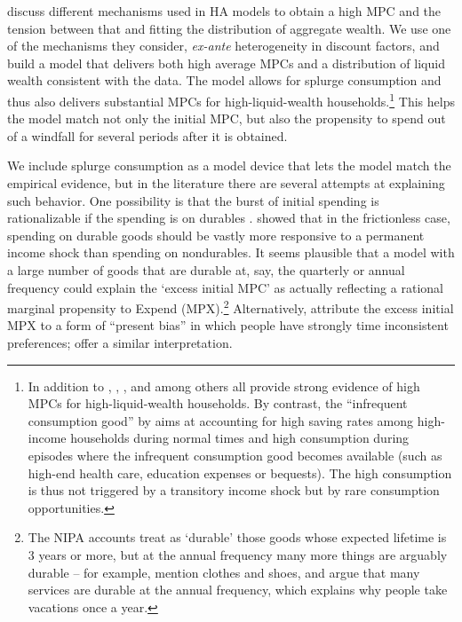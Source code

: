 \documentclass[\econtexRoot/HAFiscal]{subfiles}
\begin{document}
\cite{kaplanMPC2022} discuss different mechanisms used in HA models to obtain a high MPC and the tension between that and fitting the distribution of aggregate wealth. We use one of the mechanisms they consider, \textit{ex-ante} heterogeneity in discount factors, and build a model that delivers both high average MPCs and a distribution of liquid wealth consistent with the data. The model allows for splurge consumption and thus also delivers substantial MPCs for high-liquid-wealth households.\footnote{In addition to \cite{fagereng_mpc_2021}, \cite{graham2024mental}, \cite{crawley2023MicroMacro}, and \cite{kueng2018excess} among others all provide strong evidence of high MPCs for high-liquid-wealth households. By contrast, the ``infrequent consumption good'' by \citet{melcangi2024stock} aims at accounting for high saving rates among high-income households during normal times and high consumption during episodes where the infrequent consumption good becomes available (such as high-end health care, education expenses or bequests). The high consumption is thus not triggered by a transitory income shock but by rare consumption opportunities.} This helps the model match not only the initial MPC, but also the propensity to spend out of a windfall for several periods after it is obtained.

We include splurge consumption as a model device that lets the model match the empirical evidence, but in the literature there are several attempts at explaining such behavior. One possibility is that the burst of initial spending is rationalizable if the spending is on durables \citep{bcShocksStocks}.  \cite{mankiw:durgoods} showed that in the frictionless case, spending on durable goods should be vastly more responsive to a permanent income shock than spending on nondurables. It seems plausible that a model with a large number of goods that are durable at, say, the quarterly or annual frequency could explain the `excess initial MPC' as actually reflecting a rational marginal propensity to Expend (MPX).\footnote{The NIPA accounts treat as `durable' those goods whose expected lifetime is 3 years or more, but at the annual frequency many more things are arguably durable -- for example, \cite{bdTimeSeriesC} mention clothes and shoes, and \cite{hkpMemorable} argue that many services are durable at the annual frequency, which explains why people take vacations once a year.} Alternatively, \cite{indarte2024explains} attribute the excess initial MPX to a form of ``present bias'' in which people have strongly time inconsistent preferences; \cite{lmmPresentBias} offer a similar interpretation. 
\end{document}
